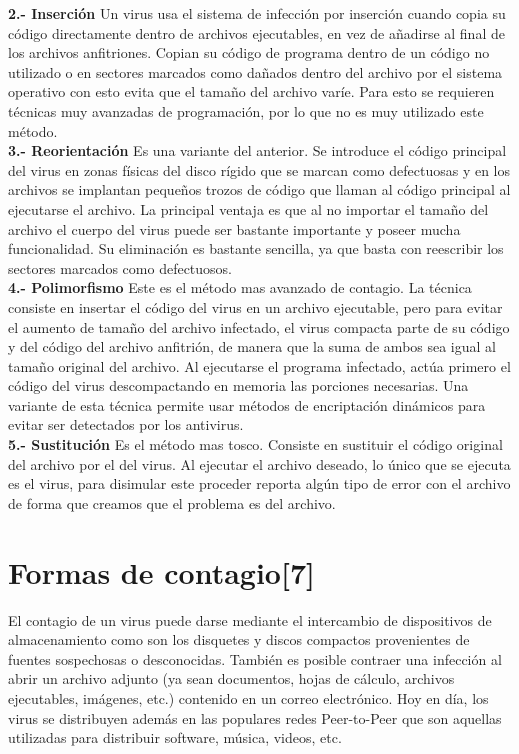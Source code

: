 \documentclass[12pt,a4paper]{article}
\begin{document}
	\textbf{2.- Inserción}
	Un virus usa el sistema de infección por inserción cuando copia su código directamente dentro de archivos ejecutables, en vez de añadirse al final de los archivos anfitriones. Copian su código de programa dentro de un código no utilizado o en sectores marcados como dañados dentro del archivo por el sistema operativo con esto evita que el tamaño del archivo varíe. Para esto se requieren técnicas muy avanzadas de programación, por lo que no es muy utilizado este método.\\
	
	\textbf{3.- Reorientación}
	Es una variante del anterior. Se introduce el código principal del virus en zonas físicas del disco rígido que se marcan como defectuosas y en los archivos se implantan pequeños trozos de código que llaman al código principal al ejecutarse el archivo. La principal ventaja es que al no importar el tamaño del archivo el cuerpo del virus puede ser bastante importante y poseer mucha funcionalidad. Su eliminación es bastante sencilla, ya que basta con reescribir los sectores marcados como defectuosos.\\
	
	\textbf{4.- Polimorfismo}
	Este es el método mas avanzado de contagio. La técnica consiste en insertar el código del virus en un archivo ejecutable, pero para evitar el aumento de tamaño del archivo infectado, el virus compacta parte de su código y del código del archivo anfitrión, de manera que la suma de ambos sea igual al tamaño original del archivo. Al ejecutarse el programa infectado, actúa primero el código del virus descompactando en memoria las porciones necesarias. Una variante de esta técnica permite usar métodos de encriptación dinámicos para evitar ser detectados por los antivirus.\\
	
	\textbf{5.- Sustitución}
	Es el método mas tosco. Consiste en sustituir el código original del archivo por el del virus. Al ejecutar el archivo deseado, lo único que se ejecuta es el virus, para disimular este proceder reporta algún tipo de error con el archivo de forma que creamos que el problema es del archivo.
	
	\section{Formas de contagio[7]}
	
	El contagio de un virus puede darse mediante el intercambio de dispositivos de almacenamiento como son los disquetes y discos compactos provenientes de fuentes sospechosas o desconocidas. También es posible contraer una infección al abrir un archivo adjunto (ya sean documentos, hojas de cálculo, archivos ejecutables, imágenes, etc.) contenido en un correo electrónico.
	Hoy en día, los virus se distribuyen además en las populares redes Peer-to-Peer que son aquellas utilizadas para distribuir software, música, videos, etc.
	
\end{document}
